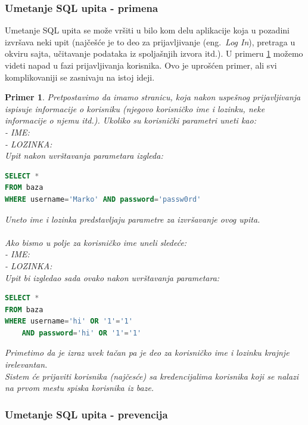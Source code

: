 \documentclass[a4paper]{article}
\newtheorem{primer}{Primer}[section]
\begin{document}
\subsubsection{Umetanje SQL upita - primena}

Umetanje SQL upita se može vršiti u bilo kom delu aplikacije koja u pozadini izvršava neki upit (najčešće je to deo za prijavljivanje (eng.~{\em Log In}), pretraga u okviru sajta, učitavanje podataka iz spoljašnjih izvora itd.). U primeru \ref{primer2} možemo videti napad u fazi prijavljivanja korisnika. Ovo je uprošćen primer, ali svi komplikovaniji se zasnivaju na istoj ideji.
\begin{primer}
\label{primer2}
Pretpostavimo da imamo stranicu, koja nakon uspešnog prijavljivanja ispisuje informacije o korisniku (njegovo korisničko ime i lozinku, neke informacije o njemu itd.). Ukoliko su korisnički parametri uneti kao:\\
- IME: \\
- LOZINKA: \\
Upit nakon uvrštavanja parametara izgleda:

\begin{lstlisting}[language=SQL]
SELECT * 
FROM baza 
WHERE username='Marko' AND password='passw0rd'
\end{lstlisting}
Uneto ime i lozinka predstavljaju parametre za izvršavanje ovog upita.\\\\
Ako bismo u polje za korisničko ime uneli sledeće:\\
- IME: \\
- LOZINKA: \\
Upit bi izgledao sada ovako nakon uvrštavanja parametara:

\begin{lstlisting}[language=SQL]
SELECT * 
FROM baza 
WHERE username='hi' OR '1'='1' 
	AND password='hi' OR '1'='1'
\end{lstlisting}

Primetimo da je izraz  uvek tačan pa je deo za korisničko ime i lozinku krajnje irelevantan.\\
Sistem će prijaviti korisnika (najčesće) sa kredencijalima korisnika koji se nalazi na prvom mestu spiska korisnika iz baze.\\
\end{primer}

\subsubsection{Umetanje SQL upita - prevencija}
\end{document}
